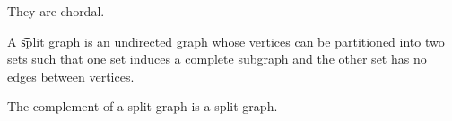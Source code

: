 
\sbasic

























\sstart
{}


They are chordal.


A \t{split graph} is an undirected graph whose vertices can be partitioned into two sets such that one set induces a complete subgraph and the other set has no edges between vertices.


\begin{prop}

  The complement of a split graph is a split graph.

\end{prop}
\strats
